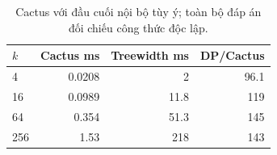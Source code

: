 \begin{table}[htbp]
\centering
\small
\setlength{\tabcolsep}{4pt}
\caption{Cactus với đầu cuối nội bộ tùy ý; toàn bộ đáp án đối chiếu công thức độc lập.}
\label{tab:cactus-repeated}
\begin{tabular}{lrrr}
\toprule
$k$ & Cactus ms & Treewidth ms & DP/Cactus \\
\midrule
4 & 0.0208 & 2 & 96.1 \\
16 & 0.0989 & 11.8 & 119 \\
64 & 0.354 & 51.3 & 145 \\
256 & 1.53 & 218 & 143 \\
\bottomrule
\end{tabular}
\end{table}
